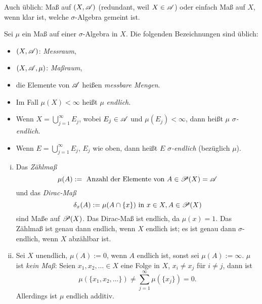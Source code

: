 \begin{rmrk*}
 Auch üblich: Maß auf $(X, \mathscr{A})$ (redundant, weil $X \in \mathscr{A}$) oder einfach Maß auf $X$, wenn klar ist, welche $\sigma$-Algebra gemeint ist.
\end{rmrk*}

\begin{prgp}
 Sei $\mu$ ein Maß auf einer $\sigma$-Algebra in $X$. Die folgenden Bezeichnungen sind üblich:
 \begin{itemize}
  \item $(X,\mathscr{A})$: \emph{Messraum},
  \item $(X,\mathscr{A},\mu)$: \emph{Maßraum},
  \item die Elemente von $\mathscr{A}$ heißen \emph{messbare Mengen}.
  \item Im Fall $\mu(X) < \infty$ heißt $\mu$ \emph{endlich}.
  \item Wenn $X = \bigcup_{j=1}^\infty E_j$, wobei $E_j \in \mathscr{A}$ und $\mu(E_j) < \infty$, dann heißt $\mu$ \emph{$\sigma$-endlich}.
  \item Wenn $E = \bigcup_{j=1}^\infty E_j$, $E_j$ wie oben, dann heißt $E$ \emph{$\sigma$-endlich} (bezüglich $\mu$).
 \end{itemize}
\end{prgp}

\begin{exmp}
 \begin{enumerate}[(i)]
  \item Das \emph{Zählmaß} 
   \[ \mu(A) := \text{ Anzahl der Elemente von } A \in \mathscr{P}(X) = \mathscr{A} \]
   und das \emph{Dirac-Maß} 
   \[ \delta_x(A) := \mu(A \cap \{x\}) \text{ in } x \in X, A \in \mathscr{P}(X) \]
   sind Maße auf $\mathscr{P}(X)$. Das Dirac-Maß ist endlich, da $\mu(x) = 1$. Das Zählmaß ist genau dann endlich, wenn $X$ endlich ist; es ist genau dann $\sigma$-endlich, wenn $X$ abzählbar ist.
  \item Sei $X$ unendlich, $\mu(A) := 0$, wenn $A$ endlich ist, sonst sei $\mu(A) := \infty$. $\mu$ ist \emph{kein Maß}: Seien $x_1, x_2, \ldots \in X$ eine Folge in $X$, $x_i \ne x_j$ für $i \ne j$, dann ist
  \[ \mu( \{ x_1, x_2, \ldots \} ) \ne \sum_{j=1}^\infty \mu( \{ x_j \} ) = 0. \]
  Allerdings ist $\mu$ endlich additiv.
 \end{enumerate}
\end{exmp}

